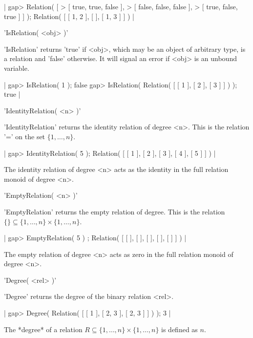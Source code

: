 |    gap> Relation( [ 
    > [ true, true, false ],
    > [ false, false, false ],
    > [ true, false, true ] ] ); 
    Relation( [ [ 1, 2 ], [  ], [ 1, 3 ] ] ) |

%

'IsRelation( <obj> )'

'IsRelation' returns 'true' if <obj>, which may be an object of arbitrary
type, is a relation and  'false' otherwise.  It  will signal an error  if
<obj> is an unbound variable.

|    gap> IsRelation( 1 );
    false
    gap> IsRelation( Relation(  [ [ 1 ], [ 2 ], [ 3 ] ] ) );
    true |


'IdentityRelation( <n> )'

'IdentityRelation' returns the identity relation  of degree <n>.  This is
the relation '=' on the set $\{1, \dots, n\}$.

|    gap> IdentityRelation( 5 );
    Relation( [ [ 1 ], [ 2 ], [ 3 ], [ 4 ], [ 5 ] ] ) |

The identity relation  of  degree <n> acts  as  the identity in  the full
relation monoid of degree <n>.


'EmptyRelation( <n> )'

'EmptyRelation'  returns  the  empty relation  of degree.     This is the
relation $\{ \} \subseteq \{1, \dots, n\} \times \{1, \dots, n\}$.

|    gap> EmptyRelation( 5 ) ;
    Relation( [ [  ], [  ], [  ], [  ], [  ] ] ) |

The empty relation of degree <n> acts as zero in the full relation monoid
of degree <n>.


'Degree( <rel> )'

'Degree' returns the degree of the binary relation <rel>.

|    gap> Degree( Relation( [ [ 1 ], [ 2, 3 ], [ 2, 3 ] ] ) );               
    3 |

The *degree*  of  a relation $R  \subseteq  \{1, \dots,   n\} \times \{1,
\dots, n\}$ is defined as $n$.

